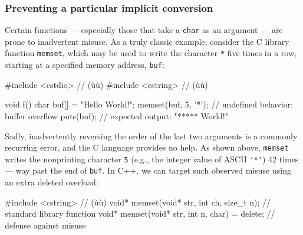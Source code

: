 \subsubsection[Preventing a particular implicit conversion]{Preventing a particular implicit conversion}\label{preventing-a-particular-implicit-conversion}

Certain functions --- especially those that take a \lstinline!char! as an
argument --- are prone to inadvertent misuse. As a truly classic
example, consider the C library function \lstinline!memset!, which may be used
to write the character \lstinline!*! five times in a row, starting at a
specified memory address, \lstinline!buf!:

%
\begin{emcppslisting}
#include <cstdio>   // (ù{}ù)
#include <cstring>  // (ù{}ù)

void f()
{
    char buf[] = "Hello World!";
    memset(buf, 5, '*');  // undefined behavior: buffer overflow
    puts(buf);            // expected output: "***** World!"
}
\end{emcppslisting}


\noindent Sadly, inadvertently reversing the order of the last two arguments is a commonly
recurring error, and the C language provides no help. As shown above, \lstinline!memset! writes the nonprinting character \lstinline!5! (e.g., the integer value of ASCII \lstinline!'*'!) 42 times --- way past the end of \lstinline!buf!. In C++, we
can target such observed misuse using an extra deleted overload:

\begin{emcppslisting}
#include <cstring>  // (ù{}ù)
void* memset(void* str, int ch, size_t n);      // standard library function
void* memset(void* str, int n, char) = delete;  // defense against misuse
\end{emcppslisting}

